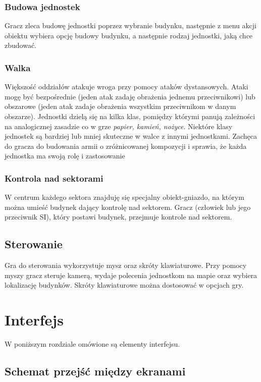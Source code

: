 \documentclass[a4paper]{scrreprt}
\begin{document}
\subsection{Budowa jednostek}
Gracz zleca budowę jednostki poprzez wybranie budynku, następnie z menu akcji obiektu wybiera opcję budowy budynku, a następnie rodzaj jednostki, jaką chce zbudować. 
\subsection{Walka}
Większość oddziałów atakuje wroga przy pomocy ataków dystansowych. Ataki mogę być bezpośrednie (jeden atak zadaję obrażenia jednemu przeciwnikowi) lub obszarowe (jeden atak zadaje obrażenia wszystkim przeciwnikom w danym obszarze). Jednostki dzielą się na kilka klas, pomiędzy którymi panują zależności na analogicznej zasadzie co w grze \emph{papier, kamień, nożyce}. Niektóre klasy jednostek są bardziej lub mniej skuteczne w walce z innymi jednostkami. Zachęca do gracza do budowania armii o zróżnicowanej kompozycji i sprawia, że każda jednostka ma swoją rolę i zastosowanie
\subsection{Kontrola nad sektorami}
W centrum każdego sektora znajduję się specjalny obiekt-gniazdo, na którym można umieść budynek dający kontrolę nad sektorem. Gracz (człowiek lub jego przeciwnik SI), który postawi budynek, przejmuje kontrole nad sektorem. 
\section{Sterowanie}
Gra do sterowania wykorzystuje mysz oraz skróty klawiaturowe. Przy pomocy myszy gracz steruje kamerą, wydaje polecenia jednostkom na mapie oraz wybiera lokalizację budynków.
Skróty klawiaturowe można dostosować w opcjach gry.


\chapter{Interfejs}
W poniższym rozdziale omówione są elementy interfejsu. 
\section{Schemat przejść między ekranami}
\end{document}
